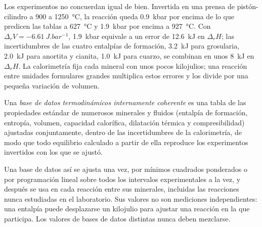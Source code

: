 Los experimentos no concuerdan igual de bien. Invertida en una prensa de pistón-cilindro a
900 a \qty{1250}{\celsius}, la reacción queda \qty{0.9}{kbar} por encima de lo que predicen
las tablas a \qty{627}{\celsius} y \qty{1.9}{kbar} por encima a
\qty{927}{\celsius}. Con $\Delta_rV = \qty{-6.61}{J.bar^{-1}}$,
\qty{1.9}{kbar} equivale a un error de \qty{12.6}{kJ} en $\Delta_rH$; las
incertidumbres de las cuatro entalpías de formación, \qty{3.2}{kJ} para
grosularia, \qty{2.0}{kJ} para anortita y cianita, \qty{1.0}{kJ} para
cuarzo, se combinan en unos \qty{8}{kJ} en $\Delta_rH$. La calorimetría fija cada
mineral con unos pocos kilojulios; una reacción entre unidades formulares grandes multiplica
estos errores y los divide por una pequeña variación de volumen.

\begin{definition}\label{def:b3:petrological-thermodynamics:dataset}
Una \emph{base de datos termodinámicos internamente coherente}
es una tabla de las propiedades estándar de
numerosos minerales y fluidos (entalpía de formación, entropía, volumen, capacidad calorífica,
dilatación térmica y compresibilidad) ajustadas conjuntamente, dentro de las
incertidumbres de la calorimetría, de modo que todo equilibrio calculado a partir de ella
reproduce los experimentos invertidos con los que se ajustó.
\end{definition}

Una base de datos así se ajusta una vez, por mínimos cuadrados ponderados o por programación
lineal sobre todos los intervalos experimentales a la vez, y después se usa en cada
reacción entre sus minerales, incluidas las reacciones nunca estudiadas en el
laboratorio. Sus valores no son mediciones independientes: una entalpía puede
desplazarse un kilojulio para ajustar una reacción en la que participa. Los valores de
bases de datos distintas nunca deben mezclarse.

